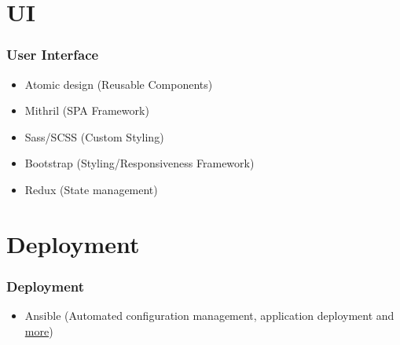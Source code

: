 \documentclass[12pt]{beamer}
\begin{document}
	\section{UI}
	\begin{frame}
		\frametitle{User Interface}
		\begin{itemize}
			\item Atomic design (Reusable Components)
			\item Mithril (SPA Framework)
			\item Sass/SCSS (Custom Styling)
			\item Bootstrap (Styling/Responsiveness Framework)
			\item Redux (State management)
		\end{itemize}
	\end{frame}

	\section{Deployment}
	\begin{frame}
		\frametitle{Deployment}
		\begin{itemize}
			\item Ansible (Automated configuration management, application deployment and \href{https://www.ansible.com/overview/how-ansible-works}{more})
		\end{itemize}
	\end{frame}
\end{document}
